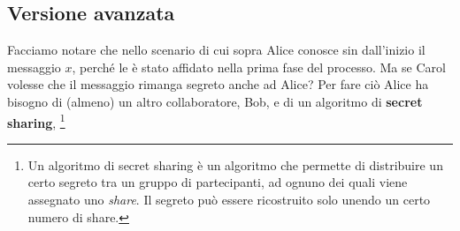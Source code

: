\subsection{Versione avanzata}
Facciamo notare che nello scenario di cui sopra Alice conosce sin 
dall'inizio il messaggio
$ x $, perché le è stato affidato nella prima fase del processo.
Ma se Carol volesse che il messaggio rimanga segreto anche ad Alice?
Per fare ciò Alice ha bisogno di (almeno) un altro collaboratore, Bob, e di un
algoritmo di \textbf{secret sharing}, \footnote{Un algoritmo di secret sharing
è un algoritmo che permette di
distribuire un certo segreto tra un gruppo di partecipanti, ad ognuno dei quali viene
assegnato uno \textit{share}. Il segreto può essere ricostruito solo unendo un certo
numero di share.}

